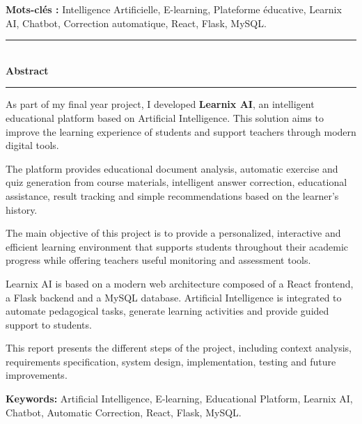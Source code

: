 \documentclass[12pt,a4paper]{report}
\newcommand{\fronttitle}[1]{
\begin{center}
{\color{learnixblue}\rule{0.35\textwidth}{1pt}}\\[0.4cm]
{\fontsize{20}{24}\selectfont\bfseries\color{learnixdark} #1}\\[0.2cm]
{\color{learnixblue}\rule{0.18\textwidth}{1pt}}
\end{center}
}
\begin{document}
\vspace{0.5cm}

\textbf{Mots-clés :} Intelligence Artificielle, E-learning, Plateforme éducative,
Learnix AI, Chatbot, Correction automatique, React, Flask, MySQL.


\clearpage
\thispagestyle{plain}

\fronttitle{Abstract}

\vspace{1.5cm}

As part of my final year project, I developed \textbf{Learnix AI}, an intelligent
educational platform based on Artificial Intelligence. This solution aims to
improve the learning experience of students and support teachers through modern
digital tools.

The platform provides educational document analysis, automatic exercise and quiz
generation from course materials, intelligent answer correction, educational
assistance, result tracking and simple recommendations based on the learner's history.

The main objective of this project is to provide a personalized, interactive and
efficient learning environment that supports students throughout their academic
progress while offering teachers useful monitoring and assessment tools.

Learnix AI is based on a modern web architecture composed of a React frontend,
a Flask backend and a MySQL database. Artificial Intelligence is integrated to
automate pedagogical tasks, generate learning activities and provide guided
support to students.

This report presents the different steps of the project, including context
analysis, requirements specification, system design, implementation, testing
and future improvements.

\vspace{0.5cm}

\textbf{Keywords:} Artificial Intelligence, E-learning, Educational Platform,
Learnix AI, Chatbot, Automatic Correction, React, Flask, MySQL.


\clearpage
{}
\listoffigures

\clearpage
{}
\listoftables
\end{document}
